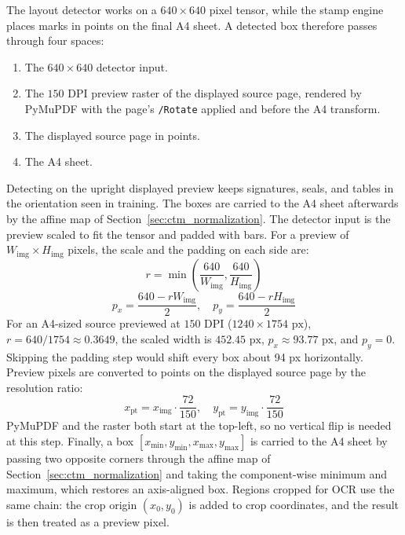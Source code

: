 The layout detector works on a $640 \times 640$ pixel tensor, while the stamp engine places marks in points on the final A4 sheet.
A detected box therefore passes through four spaces:
\begin{enumerate}
    \item The $640 \times 640$ detector input.
    \item The $150\text{ DPI}$ preview raster of the displayed source page, rendered by PyMuPDF with the page's \texttt{/Rotate} applied and before the A4 transform.
    \item The displayed source page in points.
    \item The A4 sheet.
\end{enumerate}
Detecting on the upright displayed preview keeps signatures, seals, and tables in the orientation seen in training. The boxes are carried to the A4 sheet afterwards by the affine map of Section~\ref{sec:ctm_normalization}.
The detector input is the preview scaled to fit the tensor and padded with bars.
For a preview of $W_{\text{img}} \times H_{\text{img}}$ pixels, the scale and the padding on each side are:
\begin{equation}
\label{eq:preview_scale_ratio}
r = \min\left( \frac{640}{W_{\text{img}}}, \frac{640}{H_{\text{img}}} \right)
\end{equation}
\begin{equation}
p_x = \frac{640 - r W_{\text{img}}}{2}, \quad p_y = \frac{640 - r H_{\text{img}}}{2}
\end{equation}
For an A4-sized source previewed at $150\text{ DPI}$ ($1240 \times 1754\text{ px}$), $r = 640/1754 \approx 0.3649$, the scaled width is $452.45\text{ px}$, $p_x\approx93.77\text{ px}$, and $p_y=0$. Skipping the padding step would shift every box about 94 px horizontally.
Preview pixels are converted to points on the displayed source page by the resolution ratio:
\begin{equation}
\label{eq:pixel_to_points}
x_{\text{pt}} = x_{\text{img}} \cdot \frac{72}{150}, \quad y_{\text{pt}} = y_{\text{img}} \cdot \frac{72}{150}
\end{equation}
PyMuPDF and the raster both start at the top-left, so no vertical flip is needed at this step. Finally, a box $[x_{\min},y_{\min},x_{\max},y_{\max}]$ is carried to the A4 sheet by passing two opposite corners through the affine map of Section~\ref{sec:ctm_normalization} and taking the component-wise minimum and maximum, which restores an axis-aligned box. Regions cropped for OCR use the same chain: the crop origin $(x_0,y_0)$ is added to crop coordinates, and the result is then treated as a preview pixel.


